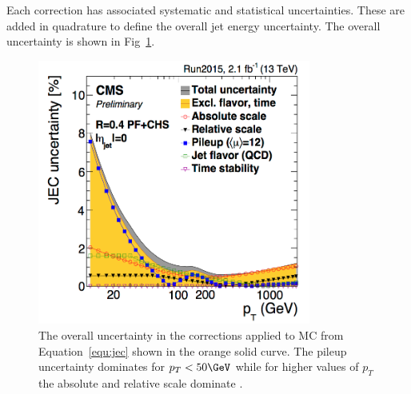 Each correction has associated systematic and statistical uncertainties. These are added in quadrature to define the overall jet energy uncertainty. The 
overall uncertainty is shown in Fig~\ref{fig:jec_unc}.

\begin{figure}
\centering
    \includegraphics[width=0.8\textwidth]{./Figures/reconstruction/jec_unc.png}
  \caption{\label{fig:jec_unc} The overall uncertainty in the corrections applied to MC from Equation~\ref{equ:jec} shown in the orange solid curve. The pileup uncertainty dominates
for $p_T < 50\GeV$ while for higher values of $p_T$ the absolute and relative scale dominate \cite{jec_fig}.}
\end{figure}
